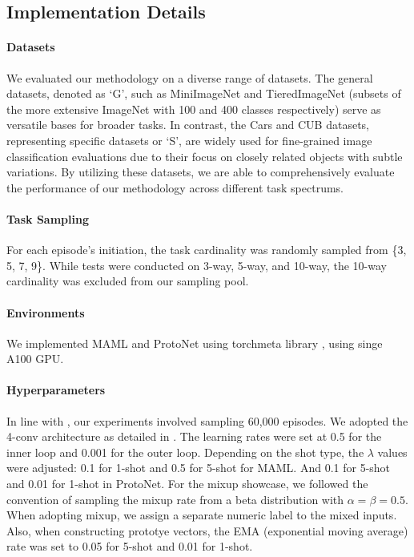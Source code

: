 \documentclass[letterpaper]{article} %
\begin{document}
\subsection{Implementation Details}
\paragraph{Datasets} We evaluated our methodology on a diverse range of datasets. The general datasets, denoted as `G', such as MiniImageNet \cite{dataset:MiniImageNet} and TieredImageNet \cite{dataset:Tieredimagenet} (subsets of the more extensive ImageNet \cite{dataset:imagenet} with 100 and 400 classes respectively) serve as versatile bases for broader tasks. In contrast, the Cars \cite{dataset:cars} and CUB \cite{dataset:cub} datasets, representing specific datasets or `S', are widely used for fine-grained image classification evaluations due to their focus on closely related objects with subtle variations. 
By utilizing these datasets, we are able to comprehensively evaluate the performance of our methodology across different task spectrums. %

\paragraph{Task Sampling} For each episode's initiation, the task cardinality was randomly sampled from \{3, 5, 7, 9\}. While tests were %
conducted on 3-way, 5-way, and 10-way, the 10-way cardinality was excluded from our sampling pool.

\paragraph{Environments} We implemented MAML and ProtoNet using torchmeta library \cite{coding:torchmeta}, using singe A100 GPU.

\paragraph{Hyperparameters} In line with \cite{episodic:GBML:BOIL}, our experiments involved sampling 60,000 episodes. We adopted the 4-conv architecture as detailed in \cite{dataset:MiniImageNet}. The learning rates were set at 0.5 for the inner loop and 0.001 for the outer loop. Depending on the shot type, the $\lambda$ values were adjusted: 0.1 for 1-shot and 0.5 for 5-shot for MAML. And 0.1 for 5-shot and 0.01 for 1-shot in ProtoNet. For the mixup showcase, we followed the convention of sampling the mixup rate from a beta distribution with $\alpha = \beta = 0.5$.  %
When adopting mixup, we assign a separate numeric label to the mixed inputs.
 Also, when constructing prototye vectors, the EMA (exponential moving average) rate was set to 0.05 for 5-shot and 0.01 for 1-shot.
\end{document}
